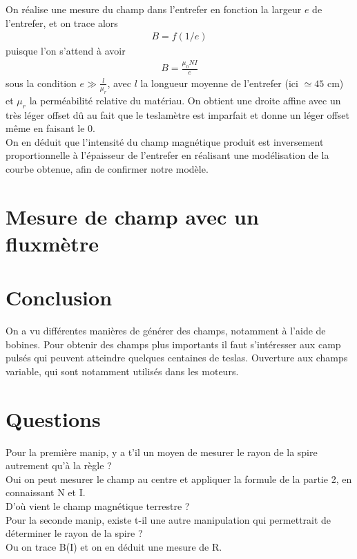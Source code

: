 \documentclass[12pt,prb,aps,epsf]{article}
\begin{document}
On réalise une mesure du champ dans l'entrefer en fonction la largeur $e$ de l'entrefer, et on trace alors 
\begin{eqnarray}
B = f(1/e)
\end{eqnarray}
puisque l'on s'attend à avoir 
\begin{eqnarray}
B = \frac{\mu_0 NI}{e}
\end{eqnarray}
sous la condition $e \gg \frac{l}{\mu_r}$, avec $l$ la longueur moyenne de l'entrefer (ici $\simeq 45$ cm) et $\mu_r$ la perméabilité relative du matériau. On obtient une droite affine avec un très léger offset dû au fait que le teslamètre est imparfait et donne un léger offset même en faisant le 0.\\
On en déduit que l'intensité du champ magnétique produit est inversement proportionnelle à l'épaisseur de l'entrefer en réalisant une modélisation de la courbe obtenue, afin de confirmer notre modèle.

\section{Mesure de champ avec un fluxmètre}

\section{Conclusion}
On a vu différentes manières de générer des champs, notamment à l'aide de bobines. Pour obtenir des champs plus importants il faut s'intéresser aux camp pulsés qui peuvent atteindre quelques centaines de teslas. Ouverture aux champs variable, qui sont notamment utilisés dans les moteurs.

\section*{Questions}
Pour la première manip, y a t'il un moyen de mesurer le rayon de la spire autrement qu'à la règle ?\\
Oui on peut mesurer le champ au centre et appliquer la formule de la partie 2, en connaissant N et I.\\

D'où vient le champ magnétique terrestre ?\\

Pour la seconde manip, existe t-il une autre manipulation qui permettrait de déterminer le rayon de la spire ?\\
Ou on trace B(I) et on en déduit une mesure de R.\\
\end{document}

